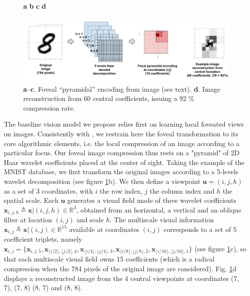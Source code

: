 \documentclass[12pt,twoside,openright]{article}
\begin{document}
\begin{figure}[b!]
	\centerline{
		\hspace{3cm}
		\textbf{a}
		\hspace{4cm}
		\textbf{b}	
		\hspace{4cm}
		\textbf{c}
		\hspace{4cm}
		\textbf{d}
		\hspace{3cm}			
	}
	\centerline{
		\includegraphics[width = \linewidth]{img/ICLR-foveated-model.pdf} 
	}
	
	\caption{\textbf{a}--\textbf{c}. Foveal ``pyramidal'' encoding from image (see text).
		\textbf{d}. Image reconstruction from 60 central coefficients, issuing a 92 \% compression rate.  
		}\label{fig:foveated}
\end{figure}

The baseline vision model we propose relies first on learning local foveated views on images.
Consistently with \citep{kortum1996implementation,wang2003foveation}, we restrain here the foveal transformation to its core algorithmic elements, i.e. the local compression of an image according to a particular focus. Our foveal image compression thus rests on a "pyramid" of 2D Haar wavelet coefficients placed at the center of sight. Taking the example of the MNIST database, we first transform the original images according to a 5-levels wavelet decomposition (see figure \ref{fig:foveated}b). We then define a viewpoint $\boldsymbol{u} = (i,j,h)$ as a set of 3 coordinates, with $i$ the row index, $j$ the column index and $h$ the spatial scale. Each $\boldsymbol{u}$ generates a visual field made of three wavelet coefficients $\boldsymbol{x}_{i,j,h} \triangleq\boldsymbol{x}|(i,j,h) \in \mathbb{R}^3$, obtained from an horizontal, a vertical and an oblique filter at location $(i,j)$ and scale $h$.  The multiscale visual information $\boldsymbol{x}_{i,j}\triangleq\boldsymbol{x}|(i,j) \in \mathbb{R}^{15}$ available at coordinates $(i,j)$ corresponds to a set of 5 coefficient triplets, namely $\boldsymbol{x}_{i,j}=\{\boldsymbol{x}_{i,j,5}, \boldsymbol{x}_{\lfloor i/2\rfloor,\lfloor j/2\rfloor,4}, \boldsymbol{x}_{\lfloor i/4\rfloor,\lfloor j/4\rfloor,3}, \boldsymbol{x}_{\lfloor i/8\rfloor,\lfloor j/8\rfloor, 2}, \boldsymbol{x}_{\lfloor i/16\rfloor,\lfloor j/16\rfloor, 1}\}$ (see figure \ref{fig:foveated}c), so that each multiscale visual field owns 15 coefficients (which is a radical compression when the 784 pixels of the original image are considered).
Fig. \ref{fig:foveated}d displays a reconstructed image from the 4 central viewpoints at coordinates (7, 7), (7, 8) (8, 7) and (8, 8).
\end{document}
